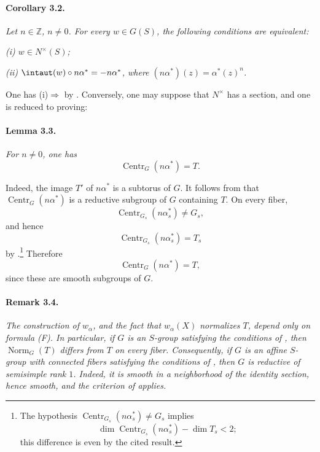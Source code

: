 \paragraph{\textbf{Corollary 3.2.}}
\emph{Let \(n\in\mathbb Z\), \(n\ne0\). For every \(w\in G(S)\),
the following conditions are equivalent:}

\smallskip
\noindent\emph{\textup{(i)} \(w\in N^\times(S)\);}

\smallskip
\noindent\emph{\textup{(ii)}
\(\intaut(w)\circ n\alpha^\ast=-n\alpha^\ast\), where
\((n\alpha^\ast)(z)=\alpha^\ast(z)^n\).}

\smallskip
One has \textup{(i)}\(\Rightarrow\)\textup{} by 
\textup{}. Conversely, one may suppose that \(N^\times\) has a
section, and one is reduced to proving:

\paragraph{\textbf{Lemma 3.3.}}
\emph{For \(n\ne0\), one has}
\[
  \operatorname{Centr}_G(n\alpha^\ast)=T.
\]

Indeed, the image \(T'\) of \(n\alpha^\ast\) is a subtorus of
\(G\). It follows from  that
\(\operatorname{Centr}_G(n\alpha^\ast)\) is a reductive subgroup
of \(G\) containing \(T\). On every fiber,
\[
  \operatorname{Centr}_{G_s}(n\alpha^\ast_s)\ne G_s,
\]
and hence
\[
  \operatorname{Centr}_{G_s}(n\alpha^\ast_s)=T_s
\]
by .\footnote{The hypothesis
\(\operatorname{Centr}_{G_s}(n\alpha^\ast_s)\ne G_s\) implies
\[
  \dim\operatorname{Centr}_{G_s}(n\alpha^\ast_s)-\dim T_s<2;
\]
this difference is even by the cited result.}
Therefore
\[
  \operatorname{Centr}_G(n\alpha^\ast)=T,
\]
since these are smooth subgroups of \(G\).

\paragraph{\textbf{Remark 3.4.}}
\emph{The construction of \(w_\alpha\), and the fact that
\(w_\alpha(X)\) normalizes \(T\), depend only on formula
\textup{(F)}. In particular, if \(G\) is an \(S\)-group satisfying
the conditions of , then \(\operatorname{Norm}_G(T)\) differs
from \(T\) on every fiber. Consequently, if \(G\) is an affine
\(S\)-group with connected fibers satisfying the conditions of ,
then \(G\) is reductive of semisimple rank \(1\). Indeed, it is
smooth in a neighborhood of the identity section, hence smooth, and
the criterion of  applies.}

